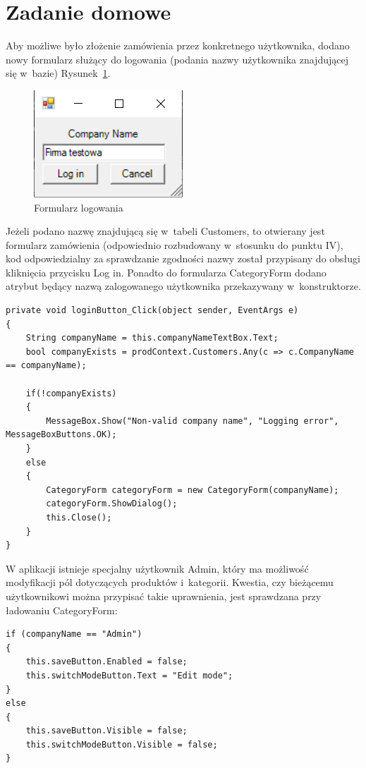 \documentclass[12pt, a4paper]{mwart}
\begin{document}
\section{Zadanie domowe}

Aby możliwe było złożenie zamówienia przez konkretnego użytkownika, dodano nowy formularz służący do logowania (podania nazwy użytkownika znajdującej się w~bazie) \ppauza Rysunek~\ref{rys:6.1}. 

\begin{figure}[ht]
  \centering
  \includegraphics[scale=1.0]{VI/6-1.png}
  \caption{Formularz logowania}
  \label{rys:6.1}
\end{figure}

Jeżeli podano nazwę znajdującą się w~tabeli Customers, to otwierany jest formularz zamówienia (odpowiednio rozbudowany w~stosunku do punktu IV), kod odpowiedzialny za sprawdzanie zgodności nazwy został przypisany do obsługi kliknięcia przycisku Log in. Ponadto do formularza CategoryForm dodano atrybut będący nazwą zalogowanego użytkownika przekazywany w~konstruktorze.

\begin{lstlisting}
private void loginButton_Click(object sender, EventArgs e)
{
	String companyName = this.companyNameTextBox.Text;
	bool companyExists = prodContext.Customers.Any(c => c.CompanyName == companyName);

	if(!companyExists)
	{
		MessageBox.Show("Non-valid company name", "Logging error", MessageBoxButtons.OK);
	}
	else
	{
		CategoryForm categoryForm = new CategoryForm(companyName);
		categoryForm.ShowDialog();
		this.Close();
	}
}
\end{lstlisting}

W aplikacji istnieje specjalny użytkownik Admin, który ma możliwość modyfikacji pól dotyczących produktów i~kategorii. Kwestia, czy bieżącemu użytkownikowi można przypisać takie uprawnienia, jest sprawdzana przy ładowaniu CategoryForm:

\begin{lstlisting}
if (companyName == "Admin")
{
	this.saveButton.Enabled = false;
	this.switchModeButton.Text = "Edit mode";
}
else
{
	this.saveButton.Visible = false;
	this.switchModeButton.Visible = false;                               
}
\end{lstlisting}
\end{document}
